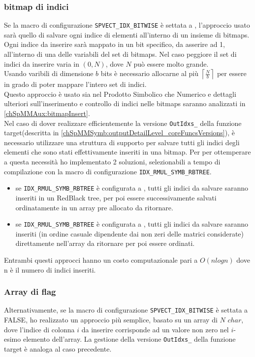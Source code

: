 \subsubsection{bitmap di indici}		\label{chSpMMSymb:bitmapsUse}
Se la macro di configurazione \verb|SPVECT_IDX_BITWISE| è settata a , l'approccio usato sarà quello 
di salvare ogni indice di elementi \nnz all'interno di un insieme di bitmaps.\\
Ogni indice da inserire sarà mappato in un bit specifico, da asserire ad 1, all'interno di una delle variabili del set di bitmaps.
Nel caso peggiore il set di indici da inserire varia in $(0,N)$, dove $N$ può essere molto grande.\\ 
Usando varibili di dimensione $b$ bits è necessario allocarne al più $\left\lceil \frac{N}{b}  \right\rceil$
per essere in grado di poter mappare l'intero set di indici.\\
Questo approccio è usato sia nel Prodotto Simbolico che Numerico e dettagli ulteriori sull'inserimento e controllo 
di indici nelle bitmaps saranno analizzati in \ref{chSpMMAux:bitmapInsert}.\\
Nel caso di dover realizzare efficientemente la versione \verb|OutIdxs_| della funzione target(descritta in \ref{chSpMMSymb:outputDetailLevel_coreFuncsVersions}), 
è necessario utilizzare una struttura di supporto per salvare tutti gli indici degli elementi \nnz
 che sono stati effettivamente inseriti in una bitmap.
Per per ottemperare a questa necessità ho implementato 2 soluzioni, selezionabili a tempo di compilazione con
la macro di configurazione \verb|IDX_RMUL_SYMB_RBTREE|.\\
\begin{itemize}
	\item se \verb|IDX_RMUL_SYMB_RBTREE| è configurata a , tutti gli indici da salvare saranno 
		  inseriti in un RedBlack tree, per poi essere successivamente salvati ordinatamente in un array pre allocato
		  da ritornare.
	\item se \verb|IDX_RMUL_SYMB_RBTREE| è configurata a , tutti gli indici da salvare saranno inseriti
		  (in ordine casuale dipendente dai non zeri delle matrici considerate) direttamente nell'array da ritornare
		  per poi essere ordinati.
\end{itemize}
Entrambi questi approcci hanno un costo computazionale pari a $O(n log n)$ dove n è il numero di indici inseriti.\\

\subsubsection{Array di flag}
Alternativamente, se la macro di configurazione \verb|SPVECT_IDX_BITWISE| è settata a FALSE, 
ho realizzato un approccio più semplice, basato su un array di $N$ $char$, 
dove l'indice di colonna $i$ da inserire corrisponde ad un valore non zero nel $i$-esimo elemento dell'array.
La gestione della versione \verb|OutIdxs_| della funzione target è analoga al caso precedente.\\  %

